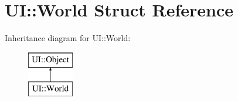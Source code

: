 \hypertarget{struct_u_i_1_1_world}{}\section{UI\+:\+:World Struct Reference}
\label{struct_u_i_1_1_world}
Inheritance diagram for UI\+:\+:World\+:\begin{figure}[H]
\begin{center}
\leavevmode
\includegraphics[height=2.000000cm]{struct_u_i_1_1_world}
\end{center}
\end{figure}
